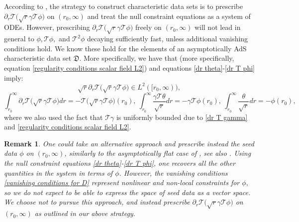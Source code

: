 \documentclass[11pt]{article}
\newtheorem{remark}{Remark}[section]
\numberwithin{equation}{section}
\begin{document}
According to , the strategy to construct characteristic data sets is to prescribe $\partial_r\mathcal{T}\big(\sqrt{r}\gamma\mathcal{T}\phi\big)$ on $(r_0,\infty)$ and treat the null constraint equations as a system of ODEs. However, prescribing $\partial_r\mathcal{T}\big(\sqrt{r}\gamma\mathcal{T}\phi\big)$ freely on $(r_0,\infty)$ will not lead in general to $\phi,\mathcal{T}\phi,$ and $\mathcal{T}^2\phi$ decaying sufficiently fast, unless additional vanishing conditions hold. We know these hold for the elements of an asymptotically AdS characteristic data set $\mathfrak{D}.$ More specifically, we have that  (more specifically, equation \eqref{regularity conditions scalar field L2}) and equations \eqref{dr theta}-\eqref{dr T phi} imply:
\begin{equation}\label{L2 condition for F1}
    \sqrt{r}\partial_r\mathcal{T}\big(\sqrt{r}\gamma\mathcal{T\phi}\big)\in L^2([r_0,\infty)),
\end{equation}
\begin{equation}\label{vanishing conditions for D}
    \int_{r_0}^{\infty}\partial_r\mathcal{T}\big(\sqrt{r}\gamma\mathcal{T\phi}\big)dr=-\mathcal{T}\big(\sqrt{r}\gamma\mathcal{T\phi}\big)(r_0),\ \int_{r_0}^{\infty}\frac{\gamma\mathcal{T}\theta}{\sqrt{r}}dr=-\gamma\mathcal{T\phi}(r_0),\ \int_{r_0}^{\infty}\frac{\theta}{\sqrt{r}}dr=-\phi(r_0),
\end{equation}
where we also used the fact that $\mathcal{T}\gamma$ is uniformly bounded due to \eqref{dr T gamma} and \eqref{regularity conditions scalar field L2}.

\begin{remark}\label{nonlocal nonlinear remark}
    One could take an alternative approach and prescribe instead the seed data $\phi$ on $(r_0,\infty)$, similarly to the asymptotically flat case of \cite{ChrWCC}, see also . Using the null constraint equations \eqref{dr theta}-\eqref{dr T phi}, one recovers all the other quantities in the system in terms of $\phi$. However, the vanishing conditions \eqref{vanishing conditions for D} represent nonlinear and non-local constraints for $\phi,$ so we do not expect to be able to express the space of seed data as a vector space. We choose not to pursue this approach, and instead prescribe $\partial_r\mathcal{T}\big(\sqrt{r}\gamma\mathcal{T}\phi\big)$ on $(r_0,\infty)$ as outlined in our above strategy.
\end{remark}
\end{document}
